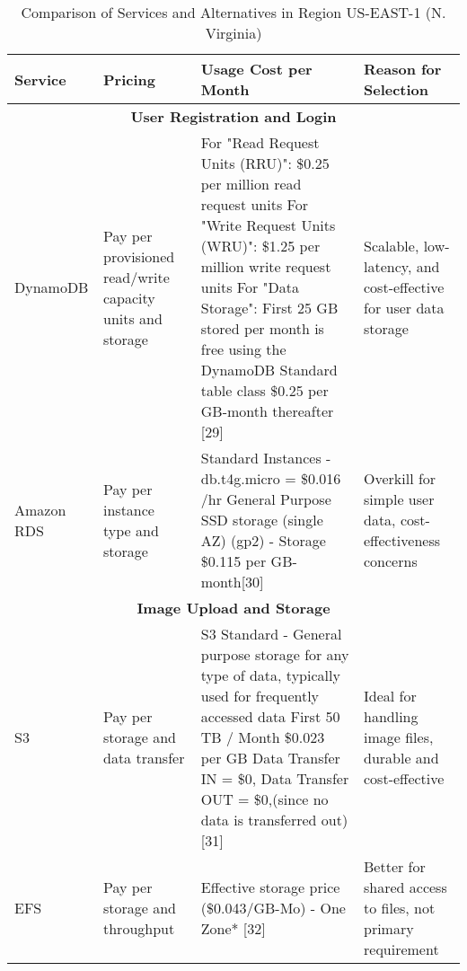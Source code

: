 \begin{table}[htbp]
    \centering
    \caption{Comparison of Services and Alternatives in Region US-EAST-1 (N. Virginia)}
    \label{tab:comparison}
    \begin{tabular}{|p{3cm}|p{3.5cm}|p{3.5cm}|p{6cm}|}
        \hline
        \textbf{Service} & \textbf{Pricing} & \textbf{Usage Cost per Month} & \textbf{Reason for Selection} \\
        \hline
        \multicolumn{4}{|c|}{\textbf{User Registration and Login}} \\
        \hline
        DynamoDB & Pay per provisioned read/write capacity units and storage 
        & 

   For "Read Request Units (RRU)": \$0.25 per million read request units
   \newline
   For "Write Request Units (WRU)": \$1.25 per million write request units
   \newline
For "Data Storage": First 25 GB stored per month is free using the DynamoDB Standard table class
\$0.25 per GB-month thereafter [29]

    
        & Scalable, low-latency, and cost-effective for user data storage \\
        \hline
        Amazon RDS & Pay per instance type and storage & 
        Standard Instances - db.t4g.micro = \$0.016 /hr
        \newline
        General Purpose SSD storage (single AZ) (gp2) - Storage	\$0.115 per GB-month[30]
        
        
        
        & Overkill for simple user data, cost-effectiveness concerns \\
        \hline
        \multicolumn{4}{|c|}{\textbf{Image Upload and Storage}} \\
        \hline
        S3 & Pay per storage and data transfer &
        S3 Standard - General purpose storage for any type of data, typically used for frequently accessed data	
First 50 TB / Month	\$0.023 per GB
\newline
Data Transfer IN = \$0, Data Transfer OUT = \$0,(since no data is transferred out) [31]
        
        & Ideal for handling image files, durable and cost-effective \\
        \hline
        EFS & Pay per storage and throughput & 
        Effective storage price (\$0.043/GB-Mo) - One Zone* [32]
        
        & Better for shared access to files, not primary requirement \\
        \hline
    \end{tabular}
\end{table}

